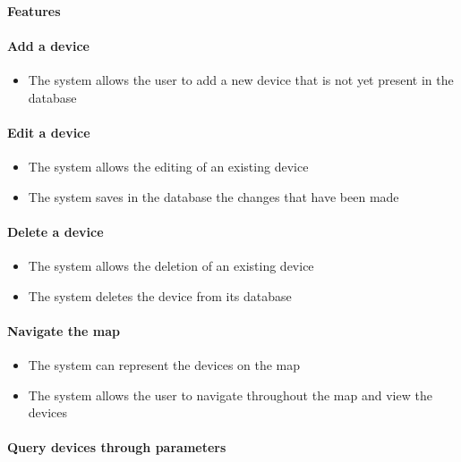 \paragraph*{Features}

\paragraph*{\small Add a device}

\begin{itemize}
    \item The system allows the user to add a new device that is not yet present in the database
\end{itemize}

\paragraph*{\small Edit a device}

\begin{itemize}
    \item The system allows the editing of an existing device
    \item The system saves in the database the changes that have been made
\end{itemize}

\paragraph*{\small Delete a device}

\begin{itemize}
    \item The system allows the deletion of an existing device
    \item The system deletes the device from its database
\end{itemize}

\paragraph*{\small Navigate the map}

\begin{itemize}
    \item The system can represent the devices on the map
    \item The system allows the user to navigate throughout the map and view the devices
\end{itemize}

\paragraph*{\small Query devices through parameters}

